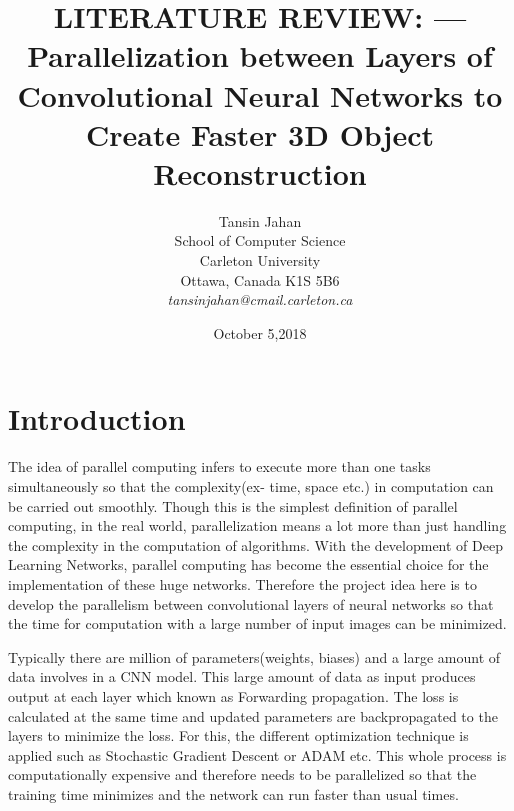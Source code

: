 \documentclass[11pt]{article}       %
\begin{document}


\title{LITERATURE REVIEW: --- Parallelization between Layers of Convolutional Neural Networks to Create Faster 3D Object Reconstruction}


\author{
Tansin Jahan\\
School of Computer Science\\
Carleton University\\
Ottawa, Canada K1S 5B6\\
{\em tansinjahan@cmail.carleton.ca}
} %
\date{October 5,2018}
\maketitle



\section{Introduction} \label{intro}

The idea of parallel computing infers to execute more than one tasks simultaneously so that the complexity(ex- time, space etc.) in computation can be carried out smoothly. Though this is the simplest definition of parallel computing, in the real world, parallelization means a lot more than just handling the complexity in the computation of algorithms. With the development of Deep Learning Networks, parallel computing has become the essential choice for the implementation of these huge networks. Therefore the project idea here is to develop the parallelism between convolutional layers of neural networks so that the time for computation with a large number of input images can be minimized.

Typically there are million of parameters(weights, biases) and a large amount of data involves in a CNN model. This large amount of data as input produces output at each layer which known as Forwarding propagation. The loss is calculated at the same time and updated parameters are backpropagated to the layers to minimize the loss. For this, the different optimization technique is applied such as Stochastic Gradient Descent or ADAM etc. This whole process is computationally expensive and therefore needs to be parallelized so that the training time minimizes and the network can run faster than usual times. 
\end{document}
